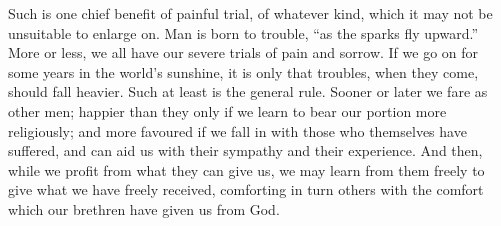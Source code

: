 Such is one chief benefit of painful trial, of whatever kind, which
it may not be unsuitable to enlarge on. Man is born to trouble,
``as the sparks fly upward.'' More or less, we all have our
severe trials of pain and sorrow. If we go on for some years in the
world's sunshine, it is only that troubles, when they come, should
fall heavier. Such at least is the general rule. Sooner or later we
fare as other men; happier than they only if we learn to bear our
portion more religiously; and more favoured if we fall in with those
who themselves have suffered, and can aid us with their sympathy and
their experience. And then, while we profit from what they can give
us, we may learn from them freely to give what we have freely
received, comforting in turn others with the comfort which our
brethren have given us from God.

